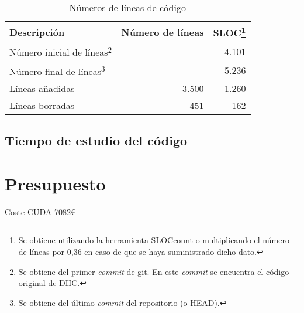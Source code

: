 \begin{table}
	\centering

	\begin{tabular}{|l|r|r|}
	\hline
	Descripción & Número de líneas & SLOC\footnote{Se obtiene utilizando la herramienta SLOCcount o multiplicando el número de líneas por 0,36 en caso de que se haya suministrado dicho dato.}\\
	\hline
	Número inicial de líneas\footnote{Se obtiene del primer \emph{commit} de git. En este \emph{commit} se encuentra el código original de DHC.} &  & 4.101\\
	\hline
	Número final de líneas\footnote{Se obtiene del último \emph{commit} del repositorio (o HEAD).} &  & 5.236\\
	\hline
	Líneas añadidas &  3.500 & 1.260\\
	\hline
	Líneas borradas & 451 & 162\\
	\hline
	\end{tabular}

	\caption{Números de líneas de código}\label{tab:num_lin_codi}
\end{table}


\subsection{Tiempo de estudio del código}

\section{Presupuesto}

Coste CUDA 7082\euro